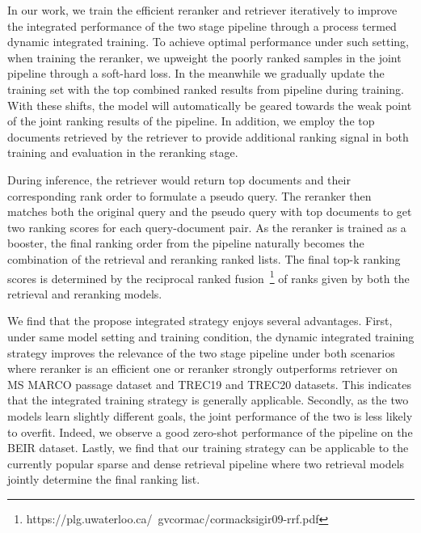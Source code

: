 {In our work, we train the efficient reranker and retriever iteratively to improve the integrated performance of the two stage pipeline through a process termed dynamic integrated training.
 To achieve optimal performance under such setting, when training the reranker, we upweight the poorly ranked samples in the joint pipeline through a soft-hard loss. In the meanwhile we gradually update the training set with the top combined ranked results from pipeline during training. With these shifts, the model will automatically be geared towards the weak point of the joint ranking results of the pipeline. In addition, we employ the top documents retrieved by the retriever to provide additional ranking signal in both training and evaluation in the reranking stage. 


During inference, the retriever would return top documents and their corresponding rank order to formulate a pseudo query. The reranker then matches both the original query and the pseudo query with top documents to get two ranking scores for each query-document pair. As the reranker is trained as a booster, the final ranking order from the pipeline naturally becomes the combination of the retrieval and reranking ranked lists. The final top-k ranking scores is determined by the reciprocal ranked fusion~\footnote{https://plg.uwaterloo.ca/~gvcormac/cormacksigir09-rrf.pdf} of ranks given by both the retrieval and reranking models.

We find that the propose integrated strategy enjoys several advantages. First, under same model setting and training condition, the dynamic integrated training strategy improves the relevance of the two stage pipeline under both scenarios where reranker is an efficient one or reranker strongly outperforms retriever on MS MARCO passage dataset and TREC19 and TREC20 datasets. This indicates that the integrated training strategy is generally applicable.  Secondly, as the two models learn slightly different goals, the joint performance of the two is less likely to overfit. Indeed, we observe a good zero-shot performance of the pipeline on the BEIR dataset. Lastly, we find that our training strategy can be applicable to the currently popular sparse and dense retrieval pipeline where two retrieval models jointly determine the final ranking list. 

}

